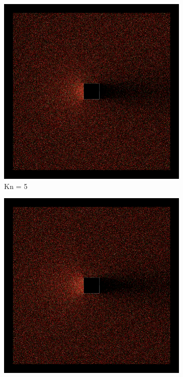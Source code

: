 \begin{figure}
    \centering
    \begin{subfigure}{0.32\textwidth}
        \centering
        \includegraphics[width=\textwidth]{Images/4. Results/Square Kn/particles/Kn5.png}
        \caption{Kn = 5}
    \end{subfigure}
    \hfill
    \begin{subfigure}{0.32\textwidth}
        \centering
        \includegraphics[width=\textwidth]{Images/4. Results/Square Kn/particles/Kn10.png}

\end{subfigure}
\end{figure}
